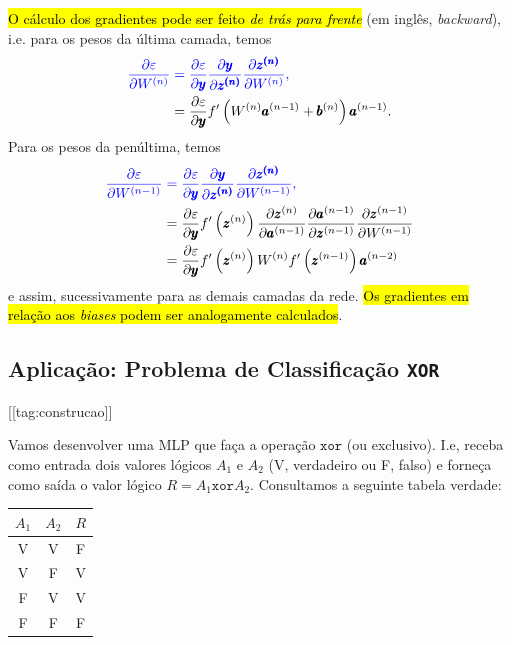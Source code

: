\hl{O cálculo dos gradientes pode ser feito \emph{de trás para frente}} (em inglês, \textit{backward}), i.e. para os pesos da última camada, temos
\begin{align}
  \color{blue}\frac{\partial\varepsilon}{\partial W^{(n)}} &\color{blue}= \frac{\partial\varepsilon}{\partial\pmb{y}}\frac{\partial\pmb{y}}{\partial\pmb{z^{(n)}}}\frac{\partial\pmb{z^{(n)}}}{\partial W^{(n)}},\\
                             &= \frac{\partial\varepsilon}{\partial\pmb{y}}f'\left(W^{(n)}\pmb{a}^{(n-1)}+\pmb{b}^{(n)}\right)\pmb{a}^{(n-1)}.
\end{align}
Para os pesos da penúltima, temos
\begin{align}
  \color{blue}\frac{\partial\varepsilon}{\partial W^{(n-1)}} &\color{blue}= \frac{\partial\varepsilon}{\partial\pmb{y}}\frac{\partial\pmb{y}}{\partial\pmb{z^{(n)}}}\frac{\partial\pmb{z^{(n)}}}{\partial W^{(n-1)}},\\
                                     &= \frac{\partial\varepsilon}{\partial\pmb{y}}f'\left(\pmb{z}^{(n)}\right)\frac{\partial\pmb{z}^{(n)}}{\partial\pmb{a}^{(n-1)}}\frac{\partial\pmb{a}^{(n-1)}}{\partial\pmb{z}^{(n-1)}}\frac{\partial\pmb{z}^{(n-1)}}{\partial W^{(n-1)}}\\
                                     &= \frac{\partial\varepsilon}{\partial\pmb{y}}f'\left(\pmb{z}^{(n)}\right)W^{(n)}f'\left(\pmb{z}^{(n-1)}\right)\pmb{a}^{(n-2)}
\end{align}
e assim, sucessivamente para as demais camadas da rede. \hl{Os gradientes em relação aos \textit{biases} podem ser analogamente calculados}.

\subsection{Aplicação: Problema de Classificação \texttt{XOR}}
[[tag:construcao]]

Vamos desenvolver uma MLP que faça a operação $\texttt{xor}$ (ou exclusivo). I.e, receba como entrada dois valores lógicos $A_1$ e $A_2$ (V, verdadeiro ou F, falso) e forneça como saída o valor lógico $R = A_1 \texttt{xor} A_2$. Consultamos a seguinte tabela verdade:

\begin{center}
  \begin{tabular}{cc|c}
    $A_1$ & $A_2$ & $R$\\\hline
    V & V & F\\
    V & F & V\\
    F & V & V\\
    F & F & F\\\hline
  \end{tabular}
\end{center}

